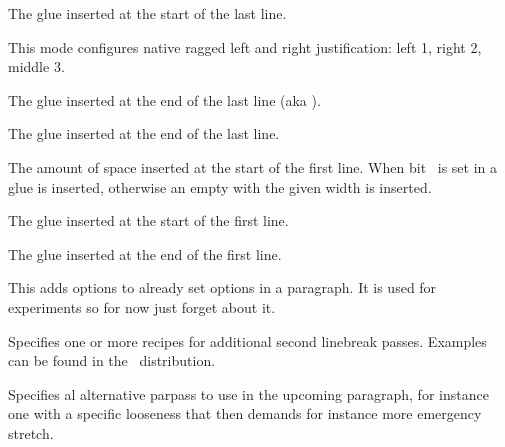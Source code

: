 The glue inserted at the start of the last line.

\stopnewprimitive

\startnewprimitive[title={\prm {parfillmode}}]

This mode configures native ragged left and right justification: left 1, right 2,
middle 3.

\stopnewprimitive

\startnewprimitive[title={\prm {parfillrightskip}}]

The glue inserted at the end of the last line (aka ).

\stopnewprimitive

\startoldprimitive[title={\prm {parfillskip}}]

The glue inserted at the end of the last line.

\stopoldprimitive

\startoldprimitive[title={\prm {parindent}}]

The amount of space inserted at the start of the first line. When bit \tobit
{}\ is set in  a glue is
inserted, otherwise an empty  with the given width is inserted.

\stopoldprimitive

\startnewprimitive[title={\prm {parinitleftskip}}]

The glue inserted at the start of the first line.

\stopnewprimitive

\startnewprimitive[title={\prm {parinitrightskip}}]

The glue inserted at the end of the first line.

\stopnewprimitive

\startnewprimitive[title={\prm {paroptions}}]

This adds options to already set options in a paragraph. It is used for
experiments so for now just forget about it.

\stopnewprimitive

\startnewprimitive[title={\prm {parpasses}}]

Specifies one or more recipes for additional second linebreak passes. Examples
can be found in the \CONTEXT\ distribution.

\stopnewprimitive

\startnewprimitive[title={\prm {parpassesexception}}]

Specifies al alternative parpass to use in the upcoming paragraph, for instance
one with a specific looseness that then demands for instance more emergency
stretch.

